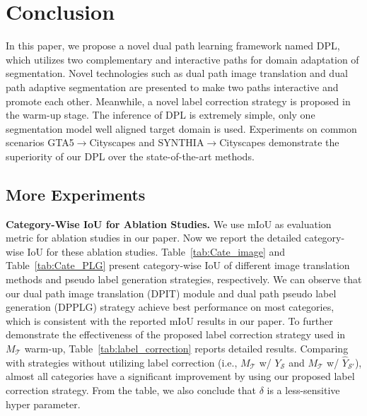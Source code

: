 \documentclass[10pt,twocolumn,letterpaper]{article}
\begin{document}
\section{Conclusion}
In this paper, we propose a novel dual path learning framework named DPL, which utilizes two complementary and interactive paths for domain adaptation of segmentation. Novel technologies such as dual path image translation and dual path adaptive segmentation are presented to make two paths interactive and promote each other. Meanwhile, a novel label correction strategy is proposed in the warm-up stage. The inference of DPL is extremely simple, only one segmentation model well aligned target domain is used. Experiments on common scenarios GTA5$\rightarrow$Cityscapes and SYNTHIA$\rightarrow$Cityscapes demonstrate the superiority of our DPL over the state-of-the-art methods.


{\small


}
\cleardoublepage
\onecolumn
\renewcommand\thesubsection{Appendix \Alph{subsection}}

\subsection{More Experiments}


{\noindent \textbf{Category-Wise IoU for Ablation Studies.}}\hspace{3pt}
We use mIoU as evaluation metric for ablation studies in our paper. Now we report the detailed category-wise IoU for these ablation studies. Table~\ref{tab:Cate_image} and Table~\ref{tab:Cate_PLG} present category-wise IoU of different image translation methods and pseudo label generation strategies, respectively. We can observe that our dual path image translation (DPIT) module and dual path pseudo label generation (DPPLG) strategy achieve best performance on most categories, which is consistent with the reported mIoU results in our paper. To further demonstrate the effectiveness of the proposed label correction strategy used in $M_{\mathcal{T}}$ warm-up, Table~\ref{tab:label_correction} reports detailed results. Comparing with strategies without utilizing label correction (i.e., $M_{\mathcal{T}}$ w/ $Y_{\mathcal{S}}$ and $M_{\mathcal{T}}$ w/ $\hat{Y}_{\mathcal{S}'}$), almost all categories have a significant improvement by using our proposed label correction strategy. From the table, we also conclude that $\delta$ is a less-sensitive hyper parameter.
\end{document}
